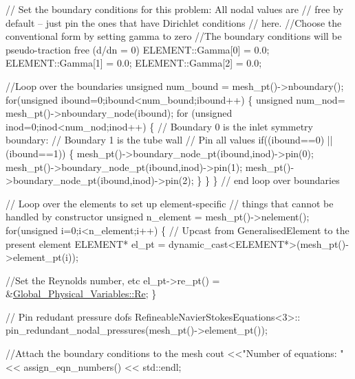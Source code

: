 \begin{DoxyCodeInclude}
 \textcolor{comment}{// Set the boundary conditions for this problem: All nodal values are}
 \textcolor{comment}{// free by default -- just pin the ones that have Dirichlet conditions}
 \textcolor{comment}{// here. }
 \textcolor{comment}{//Choose the conventional form by setting gamma to zero}
 \textcolor{comment}{//The boundary conditions will be pseudo-traction free (d/dn = 0)}
 ELEMENT::Gamma[0] = 0.0;
 ELEMENT::Gamma[1] = 0.0;
 ELEMENT::Gamma[2] = 0.0;

 \textcolor{comment}{//Loop over the boundaries}
 \textcolor{keywordtype}{unsigned} num\_bound = mesh\_pt()->nboundary();
 \textcolor{keywordflow}{for}(\textcolor{keywordtype}{unsigned} ibound=0;ibound<num\_bound;ibound++)
  \{
   \textcolor{keywordtype}{unsigned} num\_nod= mesh\_pt()->nboundary\_node(ibound);
   \textcolor{keywordflow}{for} (\textcolor{keywordtype}{unsigned} inod=0;inod<num\_nod;inod++)
    \{
     \textcolor{comment}{// Boundary 0 is the inlet symmetry boundary: }
     \textcolor{comment}{// Boundary 1 is the tube wall}
     \textcolor{comment}{// Pin all values}
     \textcolor{keywordflow}{if}((ibound==0) || (ibound==1))
      \{
       mesh\_pt()->boundary\_node\_pt(ibound,inod)->pin(0);
       mesh\_pt()->boundary\_node\_pt(ibound,inod)->pin(1);
       mesh\_pt()->boundary\_node\_pt(ibound,inod)->pin(2);
      \}
    \}
  \} \textcolor{comment}{// end loop over boundaries}

 \textcolor{comment}{// Loop over the elements to set up element-specific }
 \textcolor{comment}{// things that cannot be handled by constructor}
 \textcolor{keywordtype}{unsigned} n\_element = mesh\_pt()->nelement();
 \textcolor{keywordflow}{for}(\textcolor{keywordtype}{unsigned} i=0;i<n\_element;i++)
  \{
   \textcolor{comment}{// Upcast from GeneralisedElement to the present element}
   ELEMENT* el\_pt = \textcolor{keyword}{dynamic\_cast<}ELEMENT*\textcolor{keyword}{>}(mesh\_pt()->element\_pt(i));

   \textcolor{comment}{//Set the Reynolds number, etc}
   el\_pt->re\_pt() = &\hyperlink{namespaceGlobal__Physical__Variables_ab814e627d2eb5bc50318879d19ab16b9}{Global\_Physical\_Variables::Re};
  \}

 \textcolor{comment}{// Pin redudant pressure dofs}
 RefineableNavierStokesEquations<3>::
  pin\_redundant\_nodal\_pressures(mesh\_pt()->element\_pt());

 \textcolor{comment}{//Attach the boundary conditions to the mesh}
 cout <<\textcolor{stringliteral}{"Number of equations: "} << assign\_eqn\_numbers() << std::endl; 


\end{DoxyCodeInclude}
